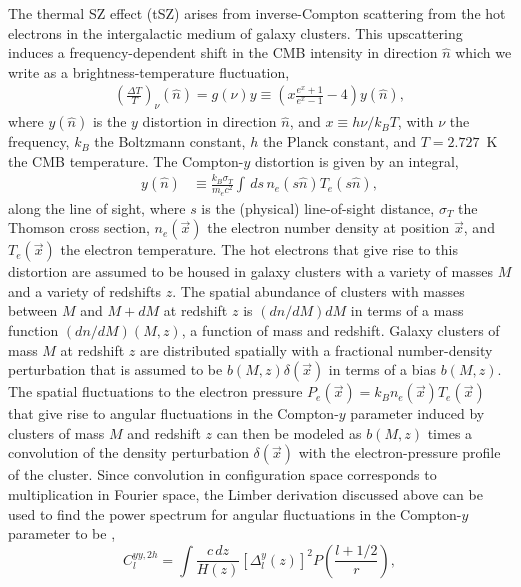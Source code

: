 \documentclass[aps,twocolumn,floats,prd,nofootinbib,10pt,floatfix]{revtex4-1}
\begin{document}
The thermal SZ effect (tSZ) arises from inverse-Compton
scattering from the hot electrons in the intergalactic medium of
galaxy clusters. This upscattering induces a frequency-dependent
shift in the CMB intensity in direction $\hat n$ which we write
as a brightness-temperature fluctuation,
\begin{align}
     \left(\frac{\Delta T}{T}\right)_\nu(\hat{n}) = g(\nu) y \equiv
     \left(x\frac{e^x + 1}{e^x - 1} - 4\right)y(\hat{n}),
\end{align}
where $y(\hat n)$ is the $y$ distortion in direction $\hat n$,
and $x \equiv h\nu/k_B T$, with $\nu$ the frequency, $k_B$ the
Boltzmann constant, $h$ the Planck constant, and $T=2.727$~K the
CMB temperature.  The Compton-$y$ distortion is given by an integral,
\begin{align}
     y(\hat{n}) &\equiv \frac{k_B\sigma_T}{m_e
     c^2}\int\,  ds \, n_e(s \hat n) T_e
     (s \hat n),
\label{eqn:yparameter}
\end{align}
along the line of sight, where $s$ is the (physical) line-of-sight
distance, $\sigma_T$ the Thomson cross section, $n_e(\vec x)$ the
electron number density at position $\vec x$, and $T_e(\vec x)$
the electron temperature.  The hot electrons that give rise to
this distortion are assumed to be housed in galaxy clusters
with a variety of masses $M$ and a variety of redshifts $z$.
The spatial abundance of clusters with masses between $M$ and
$M+dM$ at redshift $z$ is $(dn/dM)dM$ in terms of a mass
function $(dn/dM)(M,z)$, a function of mass and redshift.
Galaxy clusters of mass $M$ at redshift $z$ are distributed
spatially with a fractional number-density perturbation that is
assumed to be $b(M,z)\delta(\vec x)$ in terms of a bias
$b(M,z)$.  The spatial fluctuations to the electron pressure
$P_e(\vec x)=k_B n_e(\vec x) T_e(\vec x)$ that give rise to
angular fluctuations in the Compton-$y$ parameter induced by
clusters of mass $M$ and redshift $z$ can then be
modeled as $b(M,z)$ times a convolution of the density
perturbation $\delta(\vec x)$ with the electron-pressure profile
of the cluster.  Since convolution in configuration space
corresponds to multiplication in Fourier space, the Limber
derivation discussed above can be used to find the power
spectrum for angular fluctuations in the Compton-$y$ parameter
to be
\cite{Komatsu:1999ev,Diego:2004uw,Taburet:2010hb,Ade:2013qta,Ade:2015mva},
\begin{equation}
     C_l^{yy,2h} = \int \frac{c\, dz}{H(z)} \left[
     \Delta^{y}_l(z) \right]^2
     P\left(\frac{l+1/2}{r}\right),
\label{eqn:Cly2h}
\end{equation}
\end{document}

